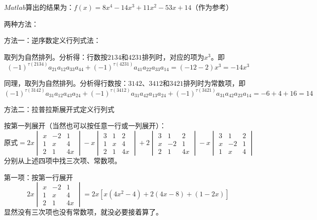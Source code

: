 \documentclass{article}
\begin{document}
\begin{jie}
$Matlab$算出的结果为：$f(x)=8x^{4}-14x^3+11x^2-53x+14$（作为参考）

两种方法：

\textcolor[rgb]{1.00,0.00,0.00}{方法一}：逆序数定义行列式法：

取列为自然排列。分析得：行数按$2134$和$4231$排列时，对应的项为$x^3$。即
\begin{equation*}
(-1)^{\tau(2134)}a_{21}a_{12}a_{33}a_{44}+(-1)^{\tau(4231)}a_{41}a_{22}a_{33}a_{14}=(-12-2)x^{3}=-14x^3
\end{equation*}

同理，取列为自然排列。分析得行数按：$3142$、$3412$和$3421$排列时为常数项，即
\begin{equation*}
(-1)^{\tau(3142)}a_{31}a_{12}a_{43}a_{24}+(-1)^{\tau(3412)}a_{31}a_{42}a_{13}a_{24}+(-1)^{\tau(3421)}a_{31}a_{42}a_{23}a_{14}=-6+4+16=14
\end{equation*}

\textcolor[rgb]{1.00,0.00,0.00}{方法二}：拉普拉斯展开式定义行列式

按第一列展开（当然也可以按任意一行或一列展开）：
\begin{equation*}
\text{原式}=2x
\begin{vmatrix}
  x & -2 & 1 \\
  1 & x & 4\\
  2 & 1 & 4x
\end{vmatrix}
-x
\begin{vmatrix}
  3 & 1 & 2 \\
  1 & x & 4\\
  2 & 1 & 4x
\end{vmatrix}
+2
\begin{vmatrix}
3 & 1 & 2 \\
  x & -2 & 1 \\
  2 & 1 & 4x
\end{vmatrix}
-x
\begin{vmatrix}
3 & 1 & 2 \\
  x & -2 & 1 \\
  1 & x & 4
\end{vmatrix}
\end{equation*}
分别从上述四项中找三次项、常数项。

第一项：按第一行展开
\begin{equation*}
2x
\begin{vmatrix}
  x & -2 & 1 \\
  1 & x & 4\\
  2 & 1 & 4x
\end{vmatrix}=2x[x(4x^2-4)+2(4x-8)+(1-2x)]
\end{equation*}
显然没有三次项也没有常数项，就没必要接着算了。


\end{jie}
\end{document}
